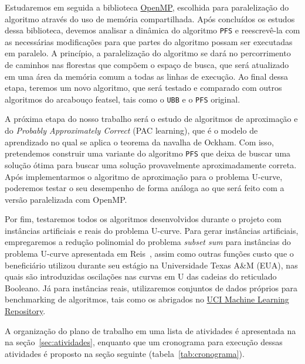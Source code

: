\documentclass[12pt]{article}
\begin{document}
Estudaremos em seguida a biblioteca \href{http://www.openmp.org/}{OpenMP}, escolhida para paralelização
do algoritmo através do uso de memória compartilhada. Após concluídos os estudos dessa biblioteca, devemos analisar a
dinâmica do algoritmo {\tt PFS} e reescrevê-la com as necessárias 
modificações para que partes do algoritmo possam ser executadas em
paralelo. A princípio, a paralelização do algoritmo se dará no 
percorrimento de caminhos nas florestas que compõem o espaço de busca, que será 
atualizado em uma área da memória comum a todas as linhas de execução.
Ao final dessa etapa, teremos um novo algoritmo, que será testado
e comparado com outros algoritmos do arcabouço featsel, tais como o {\tt UBB} e o {\tt PFS} original.

A próxima etapa do nosso trabalho será o estudo de algoritmos de 
aproximação e do \textit{Probably Approximately
Correct} (PAC learning), que é o modelo de aprendizado no qual se aplica o teorema da navalha de Ockham. Com isso, pretendemos construir uma variante do algoritmo {\tt PFS} que deixa de buscar uma solução ótima para buscar
uma solução provavelmente aproximadamente correta. Após implementarmos o algoritmo de aproximação para o problema U-curve,
poderemos testar o seu desempenho de forma análoga ao que será feito com a versão paralelizada com OpenMP.

Por fim, testaremos todos os algoritmos desenvolvidos durante o projeto
com instâncias artificiais e reais do problema U-curve. Para gerar instâncias artificiais, empregaremos a redução polinomial do problema {\em subset sum} para instâncias do problema U-curve apresentada em Reis~\cite{msreis thesis}, assim como outras funções custo que o beneficiário utilizou durante seu estágio na Universidade Texas A\&M (EUA), nas quais são introduzidas oscilações nas curvas em U das cadeias do reticulado Booleano. Já para instâncias reais, utilizaremos conjuntos de dados próprios para benchmarking de algoritmos, tais como os abrigados no \href{archive.ics.uci.edu/ml}{UCI Machine Learning Repository}.


A organização do plano de trabalho em uma lista de atividades é apresentada na na seção~\ref{sec:atividades}, enquanto que um cronograma para execução dessas atividades é proposto na seção seguinte (tabela~\ref{tab:cronograma}). 
\end{document}
